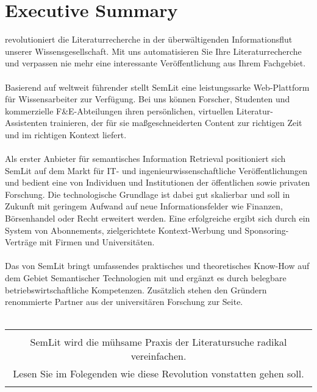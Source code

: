\section{Executive Summary}

\textsc{\color{orange}{SemLit}} revolutioniert die Literaturrecherche in der überwältigenden Informationsflut unserer Wissensgesellschaft. Mit uns automatisieren Sie Ihre Literaturrecherche und verpassen nie mehr eine interessante Veröffentlichung aus Ihrem Fachgebiet. 
\\
\\
Basierend auf weltweit führender {\color{orange}{Semantischer Technologie}} stellt SemLit eine leistungssarke Web-Plattform für Wissensarbeiter zur Verfügung. Bei uns können Forscher, Studenten und kommerzielle F\&E-Abteilungen ihren persönlichen, virtuellen Literatur-Assistenten trainieren, der für sie maßgeschneiderten Content zur richtigen Zeit und im richtigen Kontext liefert. 
\\
\\
Als erster Anbieter für semantisches Information Retrieval positioniert sich SemLit auf dem Markt für IT- und ingenieurwissenschaftliche Veröffentlichungen und bedient eine {\color{orange}{stark wachsende Zielgruppe}} von Individuen und Institutionen der öffentlichen sowie privaten Forschung. Die technologische Grundlage ist dabei gut skalierbar und soll in Zukunft mit geringem Aufwand auf neue Informationsfelder wie Finanzen, Börsenhandel oder Recht erweitert werden. Eine erfolgreiche {\color{orange}{Monetarisierung}} ergibt sich durch ein System von Abonnements, zielgerichtete Kontext-Werbung und Sponsoring-Verträge mit Firmen und Universitäten. 
\\
\\
Das {\color{orange}{Gründerteam}} von SemLit bringt umfassendes praktisches und theoretisches Know-How auf dem Gebiet Semantischer Technologien mit und ergänzt es durch belegbare  betriebswirtschaftliche Kompetenzen. Zusätzlich stehen den Gründern renommierte Partner aus der universitären Forschung zur Seite.
\\
\\
\begin{table}[h!]
  \centering
  \begin{large}
	\begin{itshape}
  \begin{tabular}{c}\hline
  \\
  {\color{orange}SemLit wird die mühsame Praxis der Literatursuche radikal vereinfachen.}\\
  {\color{orange}Lesen Sie im Folegenden wie diese Revolution vonstatten gehen soll.}\\
  \\\hline
  \end{tabular}
 	\end{itshape}
  \end{large}
\end{table}
